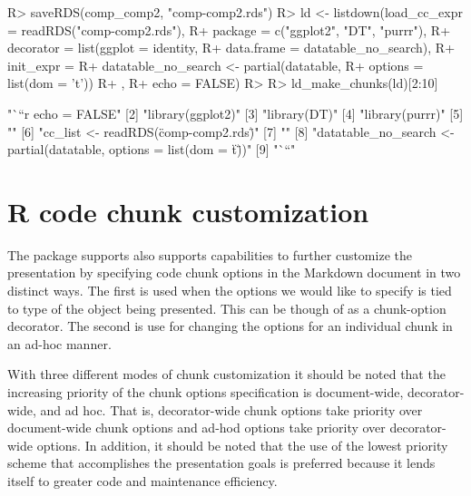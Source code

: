 \documentclass[
]{jss}
\begin{document}
\begin{CodeChunk}

\begin{CodeInput}
R> saveRDS(comp_comp2, "comp-comp2.rds")
R> ld <- listdown(load_cc_expr = readRDS("comp-comp2.rds"),
R+                package = c("ggplot2", "DT", "purrr"),
R+                decorator = list(ggplot = identity,
R+                                 data.frame = datatable_no_search),
R+                init_expr = {
R+                  datatable_no_search <- partial(datatable,
R+                                                 options = list(dom = 't'))
R+                  },
R+                echo = FALSE)
R> 
R> ld_make_chunks(ld)[2:10]
\end{CodeInput}

\begin{CodeOutput}
[1] "```{r echo = FALSE}"                                                   
[2] "library(ggplot2)"                                                      
[3] "library(DT)"                                                           
[4] "library(purrr)"                                                        
[5] ""                                                                      
[6] "cc_list <- readRDS(\"comp-comp2.rds\")"                                
[7] ""                                                                      
[8] "datatable_no_search <- partial(datatable, options = list(dom = \"t\"))"
[9] "```"                                                                   
\end{CodeOutput}
\end{CodeChunk}

\hypertarget{r-code-chunk-customization}{%
\section{R code chunk customization}\label{r-code-chunk-customization}}

The  package supports also supports capabilities to
further customize the presentation by specifying  code chunk
options in the  Markdown document in two distinct ways. The
first is used when the options we would like to specify is tied to type
of the object being presented. This can be though of as a chunk-option
decorator. The second is use for changing the options for an individual
chunk in an ad-hoc manner.

With three different modes of chunk customization it should be noted
that the increasing priority of the chunk options specification is
document-wide, decorator-wide, and ad hoc. That is, decorator-wide chunk
options take priority over document-wide chunk options and ad-hod
options take priority over decorator-wide options. In addition, it
should be noted that the use of the lowest priority scheme that
accomplishes the presentation goals is preferred because it lends itself
to greater code and maintenance efficiency.
\end{document}

